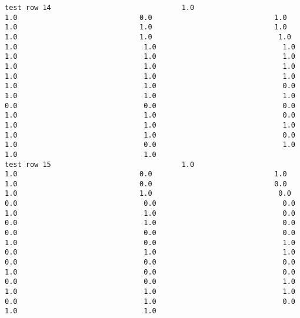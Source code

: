 \documentclass[11pt]{article}
\begin{document}
\begin{verbatim}
test row 14                               1.0                             1.0                             0.0                             1.0                             1.0                             1.0                             1.0                             1.0                             1.0                              1.0                              1.0                              1.0                              1.0                              1.0                              1.0                              1.0                              1.0                              1.0                              1.0                              1.0                              1.0                              1.0                              1.0                              1.0                              0.0                              1.0                              1.0                              1.0                              0.0                              0.0                              0.0                              1.0                              1.0                              0.0                              1.0                              1.0                              1.0                              1.0                              1.0                              0.0                              1.0                              0.0                              1.0                              1.0                              1.0
test row 15                               1.0                             1.0                             0.0                             1.0                             1.0                             0.0                             0.0                             1.0                             1.0                              0.0                              0.0                              0.0                              0.0                              1.0                              1.0                              0.0                              0.0                              1.0                              0.0                              0.0                              0.0                              0.0                              1.0                              0.0                              1.0                              0.0                              1.0                              1.0                              0.0                              0.0                              0.0                              1.0                              0.0                              0.0                              0.0                              0.0                              1.0                              1.0                              1.0                              1.0                              0.0                              1.0                              0.0                              1.0                              1.0

\end{verbatim}
\end{document}

